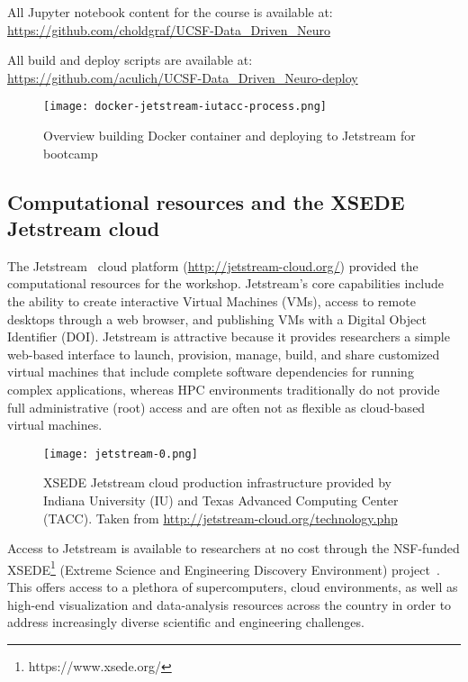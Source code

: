 All Jupyter notebook content for the course is available at:\\
\indent\indent\url{https://github.com/choldgraf/UCSF-Data_Driven_Neuro}

All build and deploy scripts are available at:\\
\indent\indent\url{https://github.com/aculich/UCSF-Data_Driven_Neuro-deploy}

\begin{figure}[h]
\centering
\texttt{[image: docker-jetstream-iutacc-process.png]}
\caption{Overview building Docker container and deploying to Jetstream for bootcamp}
\end{figure}

\subsection{Computational resources and the XSEDE Jetstream cloud}

The Jetstream~\cite{Stewart2015Jetstream} cloud platform
(\url{http://jetstream-cloud.org/}) provided the computational resources for the
workshop. Jetstream's core capabilities include the ability to create
interactive Virtual Machines (VMs), access to remote desktops through a web
browser, and publishing VMs with a Digital Object Identifier (DOI). Jetstream is
attractive because it provides researchers a simple web-based
interface\cite{NiravCyberinfra2016} to launch, provision, manage, build, and
share customized virtual machines that include complete software dependencies
for running complex applications, whereas HPC environments traditionally do not
provide full administrative (root) access and are often not as flexible as
cloud-based virtual machines.

\begin{figure}[h]
\centering
\texttt{[image: jetstream-0.png]}
\caption{XSEDE Jetstream cloud production infrastructure provided by Indiana University (IU) and Texas Advanced Computing Center (TACC). Taken from \url{http://jetstream-cloud.org/technology.php}}
\end{figure}

Access to Jetstream is available to researchers at no cost through the
NSF-funded XSEDE\footnote{https://www.xsede.org/} (Extreme Science and
Engineering Discovery Environment) project~\cite{Towns2014XSEDE}. This
offers access to a plethora of supercomputers, cloud environments, as well as high-end
visualization and data-analysis resources across the
country in order to address increasingly diverse scientific and
engineering challenges.

